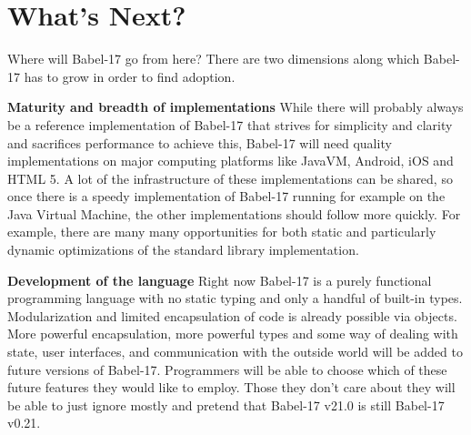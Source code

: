 \documentclass[11pt]{amsart}
\begin{document}
\section{What's Next?}

Where will Babel-17 go from here? There are two dimensions along which Babel-17 has to grow in order to find adoption.

\vspace{0.2cm}
\noindent\textbf{Maturity and breadth of implementations}
While there will probably always be a reference implementation of Babel-17 that strives for simplicity and clarity and sacrifices performance to achieve this, Babel-17 will need quality implementations on major computing platforms like JavaVM, Android, iOS and HTML 5. A lot of the infrastructure of these implementations can be shared, so once there is a speedy implementation of Babel-17 running for example on the Java Virtual Machine, the other implementations should follow more quickly. For example, there are many many opportunities for both static and particularly dynamic optimizations of the standard library implementation.

\vspace{0.2cm}
\noindent\textbf{Development of the language} 
Right now Babel-17 is a purely functional programming language with no static typing and only a handful of built-in types. Modularization and limited encapsulation of code is already possible via objects. More powerful encapsulation, more powerful types and some way of dealing with state, user interfaces, and communication with the outside world will be added to future versions of Babel-17. Programmers will be able to choose which of these future features they would like to employ. Those they don't care about they will be able to just ignore mostly and pretend that Babel-17 v21.0 is still Babel-17 v0.21.  
\end{document}
